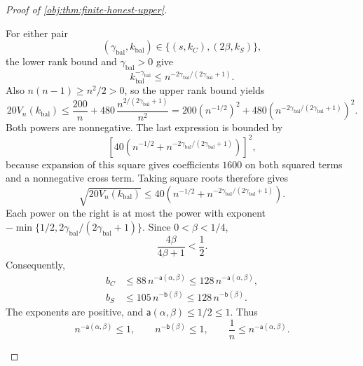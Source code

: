 \documentclass[11pt]{article}
\begin{document}
\begin{proof}[Proof of \cref{obj:thm:finite-honest-upper}]
\begin{enumerate}
For either pair
\[
(\gamma_{\mathrm{bal}},k_{\mathrm{bal}})
\in\{(s,k_C),(2\beta,k_S)\},
\]
the lower rank bound and \(\gamma_{\mathrm{bal}}>0\) give
\[
k_{\mathrm{bal}}^{-\gamma_{\mathrm{bal}}}
\le
n^{-2\gamma_{\mathrm{bal}}/(2\gamma_{\mathrm{bal}}+1)}.
\]
Also \(n(n-1)\ge n^2/2>0\), so the upper rank bound yields
\[
20V_n(k_{\mathrm{bal}})
\le
\frac{200}{n}
+
480\,\frac{n^{2/(2\gamma_{\mathrm{bal}}+1)}}{n^2}
=
200(n^{-1/2})^2
+
480\left(
n^{-2\gamma_{\mathrm{bal}}/(2\gamma_{\mathrm{bal}}+1)}
\right)^2.
\]
Both powers are nonnegative. The last expression is bounded by
\[
\left[
40\left(
n^{-1/2}
+
n^{-2\gamma_{\mathrm{bal}}/(2\gamma_{\mathrm{bal}}+1)}
\right)
\right]^2,
\]
because expansion of this square gives coefficients \(1600\) on both squared terms and a nonnegative cross term. Taking square roots therefore gives
\[
\sqrt{20V_n(k_{\mathrm{bal}})}
\le
40\left(
n^{-1/2}
+
n^{-2\gamma_{\mathrm{bal}}/(2\gamma_{\mathrm{bal}}+1)}
\right).
\]
Each power on the right is at most the power with exponent
\(-\min\{1/2,2\gamma_{\mathrm{bal}}/(2\gamma_{\mathrm{bal}}+1)\}\).
Since \(0<\beta<1/4\),
\[
\frac{4\beta}{4\beta+1}<\frac12.
\]
Consequently,
\[
\begin{aligned}
b_C
&\le88\,n^{-\mathsf a(\alpha,\beta)}
\le128\,n^{-\mathsf a(\alpha,\beta)},\\
b_S
&\le105\,n^{-\mathsf b(\beta)}
\le128\,n^{-\mathsf b(\beta)}.
\end{aligned}
\]
The exponents are positive, and \(\mathsf a(\alpha,\beta)\le1/2\le1\). Thus
\[
n^{-\mathsf a(\alpha,\beta)}\le1,
\qquad
n^{-\mathsf b(\beta)}\le1,
\qquad
\frac1n\le n^{-\mathsf a(\alpha,\beta)}.
\]


\end{enumerate}
\end{proof}
\end{document}
